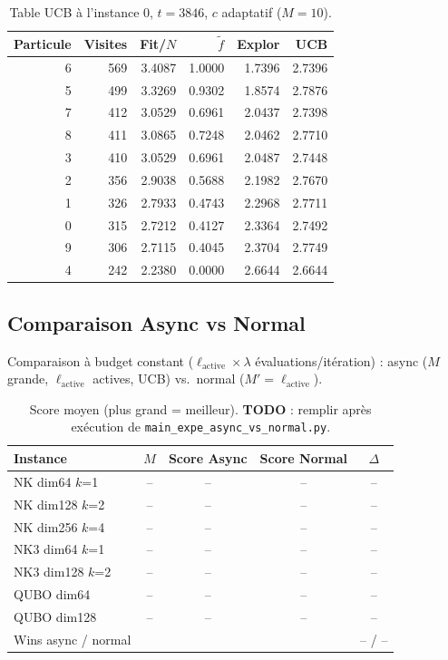 \documentclass{article}
\begin{document}
\begin{table}[ht]
  \centering
  \caption{Table UCB à l'instance 0, $t=3846$, $c$ adaptatif ($M=10$).}
  \label{tab:ucb}
  \begin{tabular}{rrrrrr}
    \toprule
    Particule & Visites & Fit/$N$ & $\tilde{f}$ & Explor & UCB \\
    \midrule
    6 & 569 & 3.4087 & 1.0000 & 1.7396 & 2.7396 \\
    5 & 499 & 3.3269 & 0.9302 & 1.8574 & 2.7876 \\
    7 & 412 & 3.0529 & 0.6961 & 2.0437 & 2.7398 \\
    8 & 411 & 3.0865 & 0.7248 & 2.0462 & 2.7710 \\
    3 & 410 & 3.0529 & 0.6961 & 2.0487 & 2.7448 \\
    2 & 356 & 2.9038 & 0.5688 & 2.1982 & 2.7670 \\
    1 & 326 & 2.7933 & 0.4743 & 2.2968 & 2.7711 \\
    0 & 315 & 2.7212 & 0.4127 & 2.3364 & 2.7492 \\
    9 & 306 & 2.7115 & 0.4045 & 2.3704 & 2.7749 \\
    4 & 242 & 2.2380 & 0.0000 & 2.6644 & 2.6644 \\
    \bottomrule
  \end{tabular}
\end{table}

\subsection{Comparaison Async vs Normal}

Comparaison à budget constant ($\ell_{\mathrm{active}} \times \lambda$ évaluations/itération) :
async ($M$ grande, $\ell_{\mathrm{active}}$ actives, UCB) vs.\ normal ($M' = \ell_{\mathrm{active}}$).

\begin{table}[ht]
  \centering
  \caption{Score moyen (plus grand = meilleur). \textbf{TODO} : remplir après exécution de
           \texttt{main\_expe\_async\_vs\_normal.py}.}
  \label{tab:results}
  \begin{tabular}{lcccc}
    \toprule
    Instance & $M$ & Score Async & Score Normal & $\Delta$ \\
    \midrule
    NK dim64  $k$=1  & -- & -- & -- & -- \\
    NK dim128 $k$=2  & -- & -- & -- & -- \\
    NK dim256 $k$=4  & -- & -- & -- & -- \\
    NK3 dim64  $k$=1 & -- & -- & -- & -- \\
    NK3 dim128 $k$=2 & -- & -- & -- & -- \\
    QUBO dim64       & -- & -- & -- & -- \\
    QUBO dim128      & -- & -- & -- & -- \\
    \midrule
    Wins async / normal & & & & -- / -- \\
    \bottomrule
  \end{tabular}
\end{table}
\end{document}
